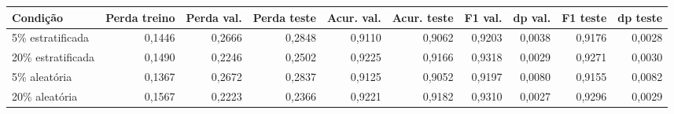 \begin{tabular}{lrrrrrrrrr}
\toprule
Condição & Perda treino & Perda val. & Perda teste & Acur. val. & Acur. teste & F1 val. & dp val. & F1 teste & dp teste \\
\midrule
5\% estratificada & 0,1446 & 0,2666 & 0,2848 & 0,9110 & 0,9062 & 0,9203 & 0,0038 & 0,9176 & 0,0028 \\
20\% estratificada & 0,1490 & 0,2246 & 0,2502 & 0,9225 & 0,9166 & 0,9318 & 0,0029 & 0,9271 & 0,0030 \\
5\% aleatória & 0,1367 & 0,2672 & 0,2837 & 0,9125 & 0,9052 & 0,9197 & 0,0080 & 0,9155 & 0,0082 \\
20\% aleatória & 0,1567 & 0,2223 & 0,2366 & 0,9221 & 0,9182 & 0,9310 & 0,0027 & 0,9296 & 0,0029 \\
\bottomrule
\end{tabular}
